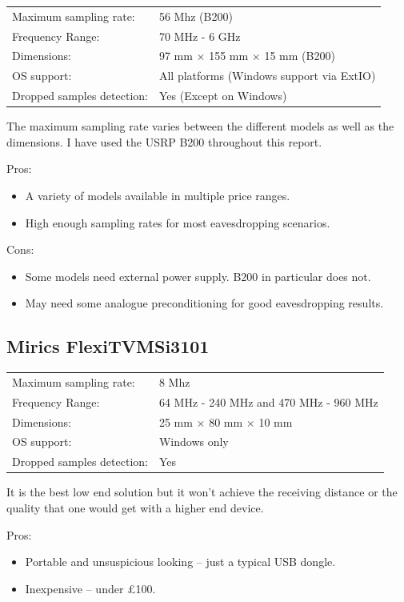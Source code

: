 \documentclass[a4paper,12pt,twoside,openright]{report}
\begin{document}
\begin{tabular}{ll}
	Maximum sampling rate: & 56 Mhz (B200) \\
	Frequency Range: & 70 MHz - 6 GHz \\
	Dimensions: & 97 mm $\times$ 155 mm $\times$ 15 mm (B200) \\
	OS support: & All platforms (Windows support via ExtIO) \\
	Dropped samples detection: & Yes (Except on Windows)
\end{tabular}

The maximum sampling rate varies between the different models as well as the dimensions. I have used the USRP B200 throughout this report.

Pros:
\begin{itemize}
	\item A variety of models available in multiple price ranges.
	\item High enough sampling rates for most eavesdropping scenarios.
\end{itemize}

Cons:
\begin{itemize}
	\item Some models need external power supply. B200 in particular does not.
	\item May need some analogue preconditioning for good eavesdropping results.
\end{itemize}

\subsection{Mirics FlexiTV\texttrademark MSi3101}

\begin{tabular}{ll}
	Maximum sampling rate: & 8 Mhz \\
	Frequency Range: & 64 MHz - 240 MHz and 470 MHz - 960 MHz \\
	Dimensions: & 25 mm $\times$ 80 mm $\times$ 10 mm \\
	OS support: & Windows only \\
	Dropped samples detection: & Yes
\end{tabular}

It is the best low end solution but it won't achieve the receiving distance or the quality that one would get with a higher end device.

Pros:
\begin{itemize}
	\item Portable and unsuspicious looking -- just a typical USB dongle.
	\item Inexpensive -- under \pounds 100.
\end{itemize}
\end{document}
